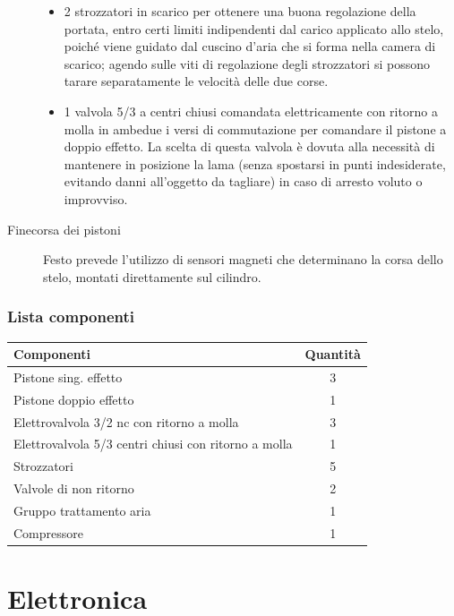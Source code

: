 \documentclass{report}
\begin{document}
\begin{description}
\begin{itemize}
  \item 2 strozzatori in scarico per ottenere una buona regolazione della portata, entro certi limiti indipendenti dal carico applicato allo stelo, poiché viene guidato dal cuscino d’aria che si forma nella camera di scarico; agendo sulle viti di regolazione degli strozzatori si possono tarare separatamente le velocità delle due corse.
  \item 1 valvola 5/3 a centri chiusi comandata elettricamente con ritorno a molla in ambedue i versi di commutazione per comandare il pistone a doppio effetto. La scelta di questa valvola è dovuta alla necessità di mantenere in posizione la lama (senza spostarsi in punti indesiderate, evitando danni all’oggetto da tagliare) in caso di arresto voluto o improvviso.
  \end{itemize}

\item[Finecorsa dei pistoni] Festo prevede l’utilizzo di sensori magneti che determinano la corsa dello stelo, montati direttamente sul cilindro.
\end{description}

\subsection{Lista componenti}
\begin{table}[H]
\centering
\begin{tabular}{|l|c|}
  \hline
  {\textbf{Componenti}} & \textbf{Quantità} \\ \hline
  Pistone sing. effetto & 3 \\ \hline
  Pistone doppio effetto & 1 \\ \hline
  Elettrovalvola 3/2 nc con ritorno a molla & 3 \\ \hline
  Elettrovalvola 5/3 centri chiusi con ritorno a molla & 1 \\ \hline
  Strozzatori & 5 \\ \hline
  Valvole di non ritorno & 2 \\ \hline
  Gruppo trattamento aria & 1 \\ \hline
  Compressore & 1 \\ \hline
\end{tabular}
\end{table}

\chapter{Elettronica}
\end{document}
